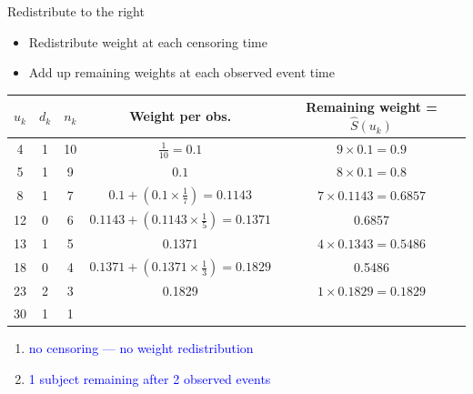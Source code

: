 \documentclass[10pt,t]{beamer}
\begin{document}
\begin{frame}{Redistribute to the right}
	\begin{itemize}
		\item Redistribute weight at each censoring time
		\item Add up remaining weights at each observed event time
	\end{itemize}
	\begin{footnotesize}
		\begin{tabular}{|c|c|c|c|c|}
			\hline
			$u_k$ & $d_k$ & $n_k$ & Weight per obs. & Remaining weight = $\widehat{S}(u_k)$ \\
			\hline
			4 & 1 & 10 & $\frac{1}{10} = 0.1$ & $9\times 0.1= 0.9$\\
			5 & 1 & 9 & $0.1$ &  $8\times 0.1= 0.8$  \\
			8 & 1 & 7 & $0.1 + (0.1\times \frac{1}{7}) = 0.1143$ & $7 \times 0.1143 = 0.6857$\\
			12 & 0 & 6 & $0.1143 +  (0.1143\times\frac{1}{5}) = 0.1371$ &  0.6857\\
			13 & 1 & 5 & 0.1371 & $4 \times 0.1343 =0.5486 $\\
			18 & 0 & 4 & $0.1371 + (0.1371\times \frac{1}{3}) = 0.1829$ & 0.5486\\
			23 & 2 & 3 & 0.1829&  $1 \times 0.1829 = 0.1829$\\
			30 & 1 & 1 & & \\
			\hline
		\end{tabular}
	\end{footnotesize}
	\begin{enumerate}
		\item \textcolor{blue}{no censoring --- no weight redistribution}
		\item \textcolor{blue}{1 subject remaining after 2 observed events}
	\end{enumerate}
\end{frame}
\end{document}
